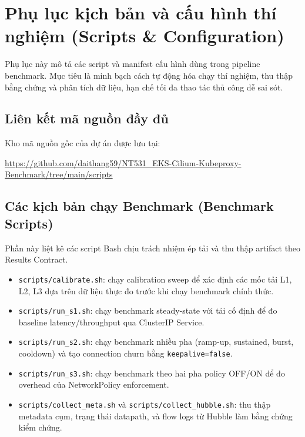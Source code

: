 
\chapter{Phụ lục kịch bản và cấu hình thí nghiệm (Scripts \& Configuration)}
\label{app:scripts-config}

Phụ lục này mô tả các script và manifest cấu hình dùng trong pipeline benchmark. Mục tiêu là minh bạch cách tự động hóa chạy thí nghiệm, thu thập bằng chứng và phân tích dữ liệu, hạn chế tối đa thao tác thủ công dễ sai sót.
\section{ Liên kết mã nguồn đầy đủ}

Kho mã nguồn gốc của dự án được lưu tại:

\begin{center}
\url{https://github.com/daithang59/NT531_EKS-Cilium-Kubeproxy-Benchmark/tree/main/scripts}
\end{center}
\section{Các kịch bản chạy Benchmark (Benchmark Scripts)}

Phần này liệt kê các script Bash chịu trách nhiệm ép tải và thu thập artifact theo Results Contract.

\begin{itemize}
		\item \texttt{scripts/calibrate.sh}: chạy calibration sweep để xác định các mốc tải L1, L2, L3 dựa trên dữ liệu thực đo trước khi chạy benchmark chính thức.
		\item \texttt{scripts/run\_s1.sh}: chạy benchmark steady-state với tải cố định để đo baseline latency/throughput qua ClusterIP Service.
		\item \texttt{scripts/run\_s2.sh}: chạy benchmark nhiều pha (ramp-up, sustained, burst, cooldown) và tạo connection churn bằng \texttt{keepalive=false}.
		\item \texttt{scripts/run\_s3.sh}: chạy benchmark theo hai pha policy OFF/ON để đo overhead của NetworkPolicy enforcement.
		\item \texttt{scripts/collect\_meta.sh} và \texttt{scripts/collect\_hubble.sh}: thu thập metadata cụm, trạng thái datapath, và flow logs từ Hubble làm bằng chứng kiểm chứng.
\end{itemize}

